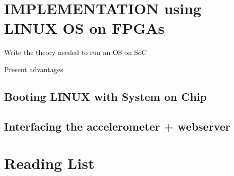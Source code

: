 \documentclass[letterpaper, portrait, margin=0.8in]{article}
\begin{document}
\clearpage

\section{IMPLEMENTATION using LINUX OS on FPGAs}


\color{red} Write the theory needed to run an OS on SoC


\color{red} Present advantages

\subsection{Booting LINUX with System on Chip}

\subsection{Interfacing the accelerometer + webserver}
 
 
\newpage
\section*{Reading List}


  
\end{document}

